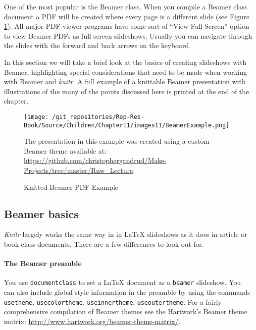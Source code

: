 One of the most popular is the Beamer class. When you compile a Beamer class document a PDF will be created where every page is a different slide (see Figure \ref{BeamerExample}). All major PDF viewer programs have some sort of ``View Full Screen'' option to view Beamer PDFs as full screen slideshows. Usually you can navigate through the slides with the forward and back arrows on the keyboard.

In this section we will take a brief look at the basics of creating slideshows with Beamer, highlighting special considerations that need to be made when working with Beamer and \emph{knitr}. A full example of a knittable Beamer presentation with illustrations of the many of the points discussed here is printed at the end of the chapter.

\begin{figure}
    \caption{Knitted Beamer PDF Example}
    \label{BeamerExample}
        \begin{center}
            \texttt{[image: /git\_repositories/Rep-Res-Book/Source/Children/Chapter11/images11/BeamerExample.png]}
        \end{center}
        {\scriptsize The presentation in this example was created using a custom Beamer theme available at: \url{https://github.com/christophergandrud/Make-Projects/tree/master/Rnw_Lecture}.}
\end{figure}

\subsection{Beamer basics}

{\emph{Knitr}} largely works the same way in in LaTeX slideshows as it does in article or book class documents. There are a few differences to look out for. 

\paragraph{The Beamer preamble}

You use \texttt{documentclass} to set a LaTeX document as a \texttt{beamer} slideshow. You can also include global style information in the preamble by using the commands \texttt{usetheme}, \texttt{usecolortheme}, \texttt{useinnertheme}, \texttt{useoutertheme}. For a fairly comprehensive compilation of Beamer themes see the Hartwork's Beamer theme matrix: \url{http://www.hartwork.org/beamer-theme-matrix/}. 

